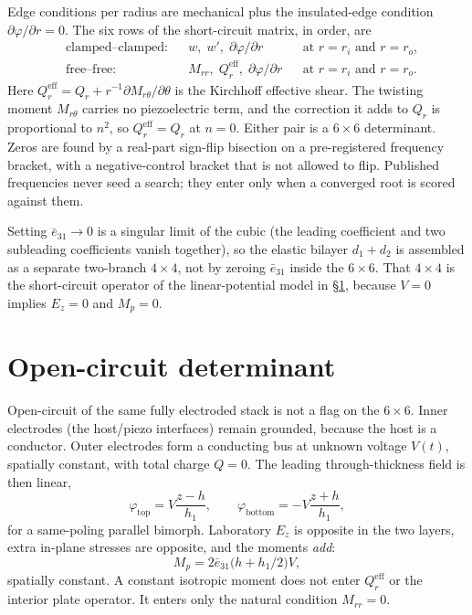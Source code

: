 \documentclass[11pt]{article}
\newcommand{\eebar}{\bar{e}_{31}}
\begin{document}
Edge conditions per radius are mechanical plus the insulated-edge
condition $\partial\varphi/\partial r=0$. The six rows of the
short-circuit matrix, in order, are
\begin{equation}
\begin{aligned}
&\text{clamped--clamped:}
 &&w,\; w',\; \partial\varphi/\partial r
 &&\text{at }r=r_i\text{ and }r=r_o,\\
&\text{free--free:}
 &&M_{rr},\; Q_r^{\mathrm{eff}},\; \partial\varphi/\partial r
 &&\text{at }r=r_i\text{ and }r=r_o.
\end{aligned}
\label{eq:rows}
\end{equation}
Here $Q_r^{\mathrm{eff}}=Q_r+r^{-1}\partial M_{r\theta}/\partial\theta$ is the
Kirchhoff effective shear. The twisting moment $M_{r\theta}$ carries no
piezoelectric term, and the correction it adds to $Q_r$ is proportional
to $n^2$, so $Q_r^{\mathrm{eff}}=Q_r$ at $n=0$.
Either pair is a $6\times6$ determinant. Zeros
are found by a real-part sign-flip bisection on a pre-registered
frequency bracket, with a negative-control bracket that is not allowed
to flip. Published frequencies never seed a search; they enter only when
a converged root is scored against them.

Setting $\eebar\to0$ is a singular limit of the cubic (the leading
coefficient and two subleading coefficients vanish together), so the
elastic bilayer $d_1+d_2$ is assembled as a separate two-branch
$4\times4$, not by zeroing $\eebar$ inside the $6\times6$. That
$4\times4$ is the short-circuit operator of the linear-potential model
in \S\ref{sec:oc}, because $V=0$ implies $E_z=0$ and $M_p=0$.

\section{Open-circuit determinant}\label{sec:oc}
Open-circuit of the same fully electroded stack is not a flag on the
$6\times6$. Inner electrodes (the host/piezo interfaces) remain grounded,
because the host is a conductor. Outer electrodes form a conducting bus
at unknown voltage $V(t)$, spatially constant, with total charge $Q=0$.
The leading through-thickness field is then linear,
\begin{equation}
\varphi_{\mathrm{top}}=V\frac{z-h}{h_1},\qquad
\varphi_{\mathrm{bottom}}=-V\frac{z+h}{h_1},
\label{eq:linpot}
\end{equation}
for a same-poling parallel bimorph. Laboratory $E_z$ is opposite in the
two layers, extra in-plane stresses are opposite, and the moments
\emph{add}:
\begin{equation}
M_p=2\eebar\bigl(h+h_1/2\bigr)V,
\label{eq:Mp}
\end{equation}
spatially constant. A constant isotropic moment does not enter $Q_r^{\mathrm{eff}}$ or
the interior plate operator. It enters only the natural condition
$M_{rr}=0$.
\end{document}
